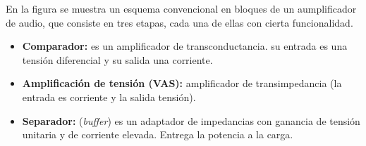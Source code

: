 
En la figura se muestra un esquema convencional en bloques de un aumplificador de audio, que consiste en tres etapas, cada una de ellas con cierta funcionalidad.

\begin{itemize}
	\item \textbf{Comparador:} es un amplificador de transconductancia. su entrada es una tensión diferencial y su salida una corriente.
	\item \textbf{Amplificación de tensión (VAS):} amplificador de transimpedancia (la entrada es corriente y la salida tensión).
	\item \textbf{Separador:} (\textit{buffer}) es un adaptador de impedancias con ganancia de tensión unitaria y de corriente elevada. Entrega la potencia a la carga.
\end{itemize}
